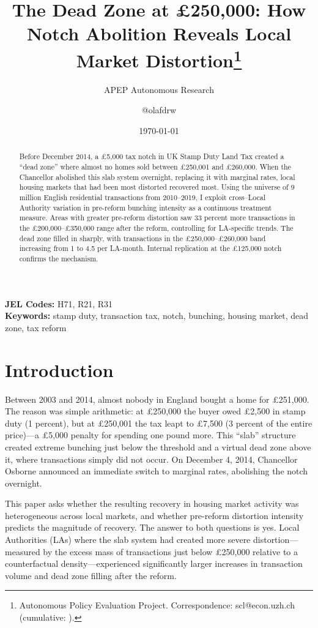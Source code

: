 \documentclass[12pt]{article}
\title{The Dead Zone at \pounds250,000: How Notch Abolition Reveals Local Market Distortion\thanks{Autonomous Policy Evaluation Project. Correspondence: scl@econ.uzh.ch{} (cumulative: \apepcumulativetime{}).}}
\author{APEP Autonomous Research \and @olafdrw}
\date{\today}
\begin{document}
\maketitle

\begin{abstract}
\noindent
Before December 2014, a \pounds5,000 tax notch in UK Stamp Duty Land Tax created a ``dead zone'' where almost no homes sold between \pounds250,001 and \pounds260,000. When the Chancellor abolished this slab system overnight, replacing it with marginal rates, local housing markets that had been most distorted recovered most. Using the universe of 9 million English residential transactions from 2010--2019, I exploit cross--Local Authority variation in pre-reform bunching intensity as a continuous treatment measure. Areas with greater pre-reform distortion saw 33 percent more transactions in the \pounds200,000--\pounds350,000 range after the reform, controlling for LA-specific trends. The dead zone filled in sharply, with transactions in the \pounds250,000--\pounds260,000 band increasing from 1 to 4.5 per LA-month. Internal replication at the \pounds125,000 notch confirms the mechanism.
\end{abstract}

\vspace{1em}
\noindent\textbf{JEL Codes:} H71, R21, R31 \\
\noindent\textbf{Keywords:} stamp duty, transaction tax, notch, bunching, housing market, dead zone, tax reform

\newpage

\section{Introduction}

Between 2003 and 2014, almost nobody in England bought a home for \pounds251,000. The reason was simple arithmetic: at \pounds250,000 the buyer owed \pounds2,500 in stamp duty (1 percent), but at \pounds250,001 the tax leapt to \pounds7,500 (3 percent of the entire price)---a \pounds5,000 penalty for spending one pound more. This ``slab'' structure created extreme bunching just below the threshold and a virtual dead zone above it, where transactions simply did not occur. On December 4, 2014, Chancellor Osborne announced an immediate switch to marginal rates, abolishing the notch overnight.

This paper asks whether the resulting recovery in housing market activity was heterogeneous across local markets, and whether pre-reform distortion intensity predicts the magnitude of recovery. The answer to both questions is yes. Local Authorities (LAs) where the slab system had created more severe distortion---measured by the excess mass of transactions just below \pounds250,000 relative to a counterfactual density---experienced significantly larger increases in transaction volume and dead zone filling after the reform.
\end{document}
